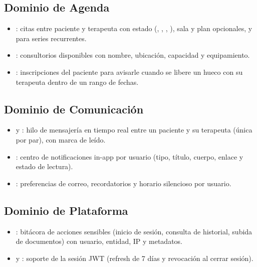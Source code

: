 \subsection{Dominio de Agenda}

\begin{itemize}
  \item {}: citas entre paciente y terapeuta con estado (, , , ), sala y plan opcionales, y  para series recurrentes.

  \item {}: consultorios disponibles con nombre, ubicación, capacidad y equipamiento.

  \item {}: inscripciones del paciente para avisarle cuando se libere un hueco con su terapeuta dentro de un rango de fechas.
\end{itemize}

\subsection{Dominio de Comunicación}

\begin{itemize}
  \item {} y : hilo de mensajería en tiempo real entre un paciente y su terapeuta (única por par), con marca de leído.

  \item {}: centro de notificaciones in-app por usuario (tipo, título, cuerpo, enlace y estado de lectura).

  \item {}: preferencias de correo, recordatorios y horario silencioso por usuario.
\end{itemize}

\subsection{Dominio de Plataforma}

\begin{itemize}
  \item {}: bitácora de acciones sensibles (inicio de sesión, consulta de historial, subida de documentos) con usuario, entidad, IP y metadatos.

  \item {} y : soporte de la sesión JWT (refresh de 7 días y revocación al cerrar sesión).
\end{itemize}

